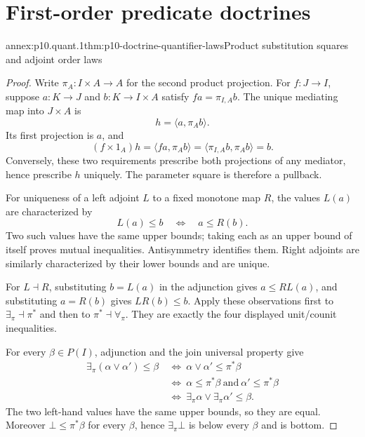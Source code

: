
\section{First-order predicate doctrines}

\begin{annexitem}{annex:p10.quant.1}{thm:p10-doctrine-quantifier-laws}{Product substitution squares and adjoint order laws}
\begin{proof}
Write \(\pi_A:I\times A\to A\) for the second product projection.
For \(f:J\to I\), suppose \(a:K\to J\) and
\(b:K\to I\times A\) satisfy \(f a=\pi_{I,A}b\).
The unique mediating map into \(J\times A\) is
\[
                              h=\langle a,\pi_A b\rangle.
\]
Its first projection is \(a\), and
\[
               (f\times1_A)h
                  =\langle f a,\pi_A b\rangle
                  =\langle\pi_{I,A}b,\pi_A b\rangle=b.
\]
Conversely, these two requirements prescribe both projections
of any mediator, hence prescribe \(h\) uniquely.
The parameter square is therefore a pullback.

For uniqueness of a left adjoint \(L\) to a fixed monotone
map \(R\), the values \(L(a)\) are characterized by
\[
                              L(a)\leq b\quad\Longleftrightarrow\quad
                              a\leq R(b).
\]
Two such values have the same upper bounds; taking each as
an upper bound of itself proves mutual inequalities.
Antisymmetry identifies them.
Right adjoints are similarly characterized by their lower
bounds and are unique.

For \(L\dashv R\), substituting \(b=L(a)\) in the adjunction
gives \(a\leq R L(a)\), and substituting \(a=R(b)\) gives
\(L R(b)\leq b\).
Apply these observations first to
\(\exists_\pi\dashv\pi^*\) and then to
\(\pi^*\dashv\forall_\pi\).
They are exactly the four displayed unit/counit inequalities.

For every \(\beta\in P(I)\), adjunction and the join
universal property give
\[
 \begin{aligned}
 \exists_\pi(\alpha\vee\alpha')\leq\beta
 &\ \Longleftrightarrow\
       \alpha\vee\alpha'\leq\pi^*\beta\\
 &\ \Longleftrightarrow\
       \alpha\leq\pi^*\beta\ \text{and}\ \alpha'\leq\pi^*\beta\\
 &\ \Longleftrightarrow\
       \exists_\pi\alpha\vee\exists_\pi\alpha'\leq\beta.
 \end{aligned}
\]
The two left-hand values have the same upper bounds, so
they are equal.  Moreover \(\bot\leq\pi^*\beta\) for every
\(\beta\), hence \(\exists_\pi\bot\) is below every
\(\beta\) and is bottom.


\end{proof}
\end{annexitem}
